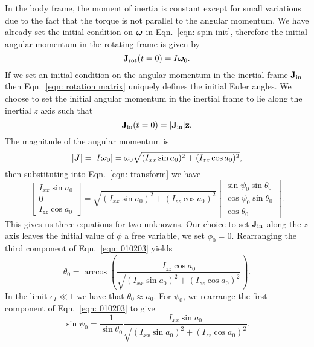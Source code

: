 \documentclass[../full_thesis/full_thesis.tex]{subfiles}
\begin{document}
In the body frame, the moment of inertia is constant except for small variations
due to the fact that the torque is not parallel to the angular momentum.
We have already set the initial condition on $\boldsymbol{\omega}$ in Eqn.~\eqref{eqn:
spin init}, therefore the initial angular momentum in the rotating frame is given by
\begin{equation}
  \mathbf{J}_{\textrm{rot}}(t=0) = I \boldsymbol{\omega}_0.
\end{equation}
If we set an initial condition on the angular momentum in the inertial frame
$\mathbf{J}_{\textrm{in}}$ then Eqn.~\eqref{eqn: rotation matrix} uniquely defines the initial
Euler angles. We choose to set the initial angular momentum in the inertial
frame to lie along the inertial $z$ axis such that
\begin{equation}
  \mathbf{J}_{\textrm{in}}(t=0) = |\mathbf{J}_{\textrm{in}}| \mathbf{z}.
\end{equation}
The magnitude of the angular momentum is
\begin{equation}
|\boldsymbol{J}| = |I \boldsymbol{\omega}_{0}|=\omega_{0}\sqrt{(I_{xx}\sin a_{0})^{2} + (I_{zz}\cos a_{0})^{2}},
\end{equation}
then substituting into Eqn.~\eqref{eqn: transform} we have
\begin{equation}
\left[ \begin{array}{c}
I_{xx}\sin a_{0} \\
0 \\
I_{zz} \cos a_{0}
\end{array}\right] =
\sqrt{(I_{xx}\sin a_{0})^{2} + (I_{zz}\cos a_{0})^{2}}
\left[ \begin{array}{c}
\sin \psi_{0} \sin \theta_{0} \\
\cos \psi_{0} \sin \theta_{0} \\
\cos \theta_{0}
\end{array}\right].
\label{eqn: 010203}
\end{equation}
This gives us three equations for two unknowns. Our choice to set $\mathbf{J}_{\textrm{in}}$ along
the $z$ axis leaves the initial value of $\phi$ a free variable,
we set $\phi_{0} = 0$.
Rearranging the third component of Eqn.~\eqref{eqn: 010203} yields
\begin{equation}
\theta_{0} = \arccos\left(\frac{I_{zz}\cos a_{0}}{ \sqrt{(I_{xx}\sin
        a_{0})^{2} + (I_{zz}\cos a_{0})^{2}}} \right).
\label{eqn: theta init}
\end{equation}
In the limit $\epsilon_{I} \ll 1$ we have that $\theta_{0} \approx a_{0}$.
For $\psi_0$, we rearrange the first component of Eqn.~\eqref{eqn: 010203} to
give
\begin{equation}
\sin\psi_{0} =\frac{1}{ \sin\theta_{0}}
\frac{ I_{xx}\sin a_{0}}{\sqrt{(I_{xx}\sin a_{0})^{2} + (I_{zz}\cos a_{0})^{2}}}.
\label{eqn: 8283}
\end{equation}
\end{document}
